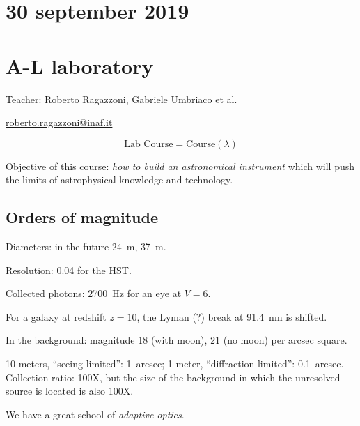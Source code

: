 \documentclass[main.tex]{subfiles}
\begin{document}
\section*{30 september 2019}
\section{A-L laboratory}

Teacher: Roberto Ragazzoni, Gabriele Umbriaco et al.

\url{roberto.ragazzoni@inaf.it}

\begin{equation}
    \text{Lab Course} = \text{Course} (\lambda)
\end{equation}

Objective of this course: \emph{how to build an astronomical instrument} which will push the limits of astrophysical knowledge and technology.

\subsection{Orders of magnitude}

Diameters: in the future \SI{24}{m}, \SI{37}{m}.

Resolution: \SI{0.04}{\arcsec} for the HST.

Collected photons: \SI{2700}{Hz} for an eye at \(V=6\).

For a galaxy at redshift \(z=10\), the Lyman (?) break at \SI{91.4}{nm} is shifted.

In the background: magnitude 18 (with moon), 21 (no moon) per arcsec square.

10 meters, ``seeing limited'': \SI{1}{arcsec}; 1 meter, ``diffraction limited'': \SI{0.1}{arcsec}. Collection ratio: 100X, but the size of the background in which the unresolved source is located is also 100X.

We have a great school of \emph{adaptive optics}.
\end{document}
